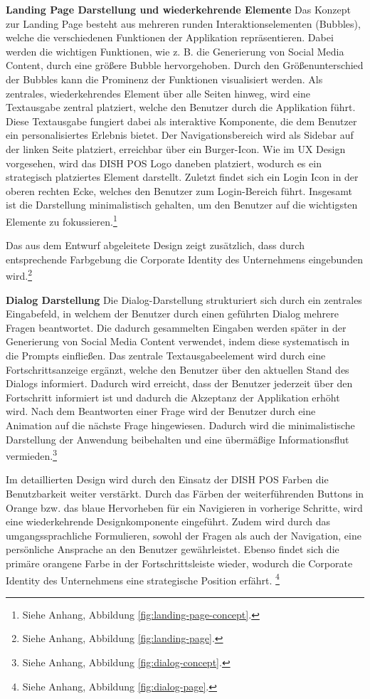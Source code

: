 \textbf{Landing Page Darstellung und wiederkehrende Elemente}\newline
Das Konzept zur Landing Page besteht aus mehreren runden Interaktionselementen (Bubbles), welche die verschiedenen Funktionen der Applikation repräsentieren.
Dabei werden die wichtigen Funktionen, wie z. B. die Generierung von Social Media Content, durch eine größere Bubble hervorgehoben.
Durch den Größenunterschied der Bubbles kann die Prominenz der Funktionen visualisiert werden.
Als zentrales, wiederkehrendes Element über alle Seiten hinweg, wird eine Textausgabe zentral platziert, welche den Benutzer durch die Applikation führt.
Diese Textausgabe fungiert dabei als interaktive Komponente, die dem Benutzer ein personalisiertes Erlebnis bietet.
Der Navigationsbereich wird als Sidebar auf der linken Seite platziert, erreichbar über ein Burger-Icon.
Wie im \ac{UX} Design vorgesehen, wird das DISH POS Logo daneben platziert, wodurch es ein strategisch platziertes Element darstellt.
Zuletzt findet sich ein Login Icon in der oberen rechten Ecke, welches den Benutzer zum Login-Bereich führt.
Insgesamt ist die Darstellung minimalistisch gehalten, um den Benutzer auf die wichtigsten Elemente zu fokussieren.\footnote{Siehe Anhang, Abbildung \ref{fig:landing-page-concept}.}

Das aus dem Entwurf abgeleitete Design zeigt zusätzlich, dass durch entsprechende Farbgebung die Corporate Identity des Unternehmens eingebunden wird.\footnote{Siehe Anhang, Abbildung \ref{fig:landing-page}.}

\textbf{Dialog Darstellung}\newline
Die Dialog-Darstellung strukturiert sich durch ein zentrales Eingabefeld, in welchem der Benutzer durch einen geführten Dialog mehrere Fragen beantwortet.
Die dadurch gesammelten Eingaben werden später in der Generierung von Social Media Content verwendet, indem diese systematisch in die Prompts einfließen.
Das zentrale Textausgabeelement wird durch eine Fortschrittsanzeige ergänzt, welche den Benutzer über den aktuellen Stand des Dialogs informiert.
Dadurch wird erreicht, dass der Benutzer jederzeit über den Fortschritt informiert ist und dadurch die Akzeptanz der Applikation erhöht wird.
Nach dem Beantworten einer Frage wird der Benutzer durch eine Animation auf die nächste Frage hingewiesen.
Dadurch wird die minimalistische Darstellung der Anwendung beibehalten und eine übermäßige Informationsflut vermieden.\footnote{Siehe Anhang, Abbildung \ref{fig:dialog-concept}.}

Im detaillierten Design wird durch den Einsatz der DISH POS Farben die Benutzbarkeit weiter verstärkt.
Durch das Färben der weiterführenden Buttons in Orange bzw. das blaue Hervorheben für ein Navigieren in vorherige Schritte, wird eine wiederkehrende Designkomponente eingeführt.
Zudem wird durch das umgangssprachliche Formulieren, sowohl der Fragen als auch der Navigation, eine persönliche Ansprache an den Benutzer gewährleistet.
Ebenso findet sich die primäre orangene Farbe in der Fortschrittsleiste wieder, wodurch die Corporate Identity des Unternehmens eine strategische Position erfährt. \footnote{Siehe Anhang, Abbildung \ref{fig:dialog-page}.}

